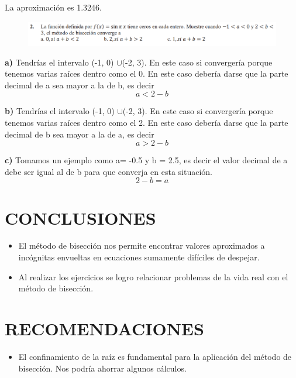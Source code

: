 \documentclass[12pt]{article}
\begin{document}
La aproximación es 1.3246.
\begin{figure}[H]
    \centering
    \includegraphics[width=1\textwidth]{./inFiles/Figures/Cap4.png}
\end{figure}

\textbf{a)}
\newline
Tendrías el intervalo (-1, 0) $\cup$(-2, 3). En este caso si convergería porque tenemos varias raíces dentro como el 0.
En este caso debería darse que la parte decimal de a sea mayor a la de b, es decir
$$a < 2-b$$

\textbf{b)}
\newline
Tendrías el intervalo (-1, 0) $\cup$(-2, 3). En este caso si convergería porque tenemos varias raíces dentro como el 2.
En este caso debería darse que la parte decimal de b sea mayor a la de a, es decir
$$a > 2-b$$

\textbf{c)}
\newline
Tomamos un ejemplo como a= -0.5 y b = 2.5, es decir el valor decimal de a debe ser igual al de b para que converja en esta situación.
$$2-b = a$$
\vspace{0.5cm}
\section*{CONCLUSIONES}
\begin{itemize}
    \item El método de bisección nos permite encontrar valores aproximados a incógnitas envueltas en ecuaciones sumamente difíciles de despejar.
    \item Al realizar los ejercicios se logro relacionar problemas de la vida real con el método de bisección.
\end{itemize}
\vspace{0.5cm}
\section*{RECOMENDACIONES}
\begin{itemize}
    \item El confinamiento de la raíz es fundamental para la aplicación del método de bisección. Nos podría ahorrar algunos cálculos.
   
\end{itemize}

\vspace{0.5cm}


\renewcommand{\refname}{\MakeUppercase{REFERENCIAS}}


\end{document}
